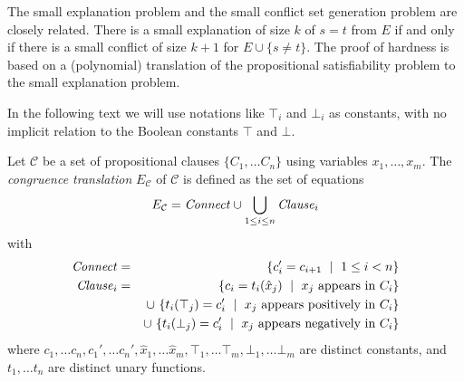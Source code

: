 \documentclass[smallextended]{svjour3}
\begin{document}
\noindent The small explanation problem and the small conflict set generation
problem are closely related.  There is a small explanation of size $k$ of $s=t$
from $E$ if and only if there is a small conflict of size $k+1$ for $E \cup
\{s\neq t\}$.  The proof of hardness is based on a (polynomial) translation of
the propositional satisfiability problem to the small explanation problem.

\newcommand{\Assignment}{{\it Assignment}}
\newcommand{\Clause}{{\it Clause}}
\newcommand{\Connect}{{\it Connect}}

In the following text we will use notations like $\top_i$ and $\bot_i$ as constants, with
no implicit relation to the Boolean constants $\top$ and $\bot$.

\begin{definition}

Let $\mathcal{C}$ be a set of propositional clauses $\{C_1,\ldots C_n\}$ using variables $x_1,\ldots,x_m$.
The \emph{congruence translation} $E_{\mathcal{C}}$ of\/ $\mathcal{C}$ is defined as the set of equations
\begin{equation*}
E_{\mathcal{C}} = \Connect \cup \bigcup_{1 \leq i \leq n}\Clause_i 
\end{equation*}
with
\begin{eqnarray*}
	\Connect &=& \{ c_{i}' = c_{i+1} \ \mid\ 1 \leq i < n\}\\
        \Clause_i &=& \{ c_i = t_i(\hat{x}_j) \ \mid\ x_j \text{ appears in } C_i \}\\
           & & \cup\ \{ t_i(\top_j) = c_i' \ \mid\ x_j \text{ appears positively in } C_i \}\\
           & & \cup\ \{ t_i(\bot_j) = c_i' \ \mid\ x_j \text{ appears negatively in } C_i \}
\end{eqnarray*}
where $c_{1},\dots c_{n},c_{1}', \dots c_{n}',
\hat{x}_1, \dots \hat{x}_m, \top_1, \dots \top_m, \bot_1, \dots \bot_m$ are distinct constants, and $t_1, \dots t_n$ are
distinct unary functions.

\end{definition}
\end{document}
